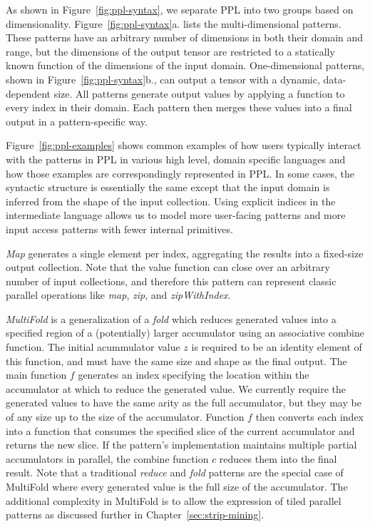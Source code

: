 As shown in Figure~\ref{fig:ppl-syntax}, we separate PPL into two groups based on dimensionality.
Figure~\ref{fig:ppl-syntax}a. lists the multi-dimensional patterns.
These patterns have an arbitrary number of dimensions in both their domain and range,
but the dimensions of the output tensor
are restricted to a statically known function of the dimensions of the input domain.
One-dimensional patterns, shown in Figure~\ref{fig:ppl-syntax}b., can output a tensor with a dynamic, data-dependent size.
All patterns generate output values by applying a function to
every index in their domain. Each pattern then merges these values into a final
output in a pattern-specific way.



Figure~\ref{fig:ppl-examples} shows common examples of how users typically interact with
the patterns in PPL in various high level, domain specific languages
and how those examples are correspondingly represented in PPL. In some cases, the syntactic structure is
essentially the same except that the input domain is inferred from the shape of
the input collection. Using explicit indices in the intermediate language allows
us to model more user-facing patterns and more input access patterns with fewer internal primitives.

\emph{Map} generates a single element per index, aggregating the results into a fixed-size output collection.
Note that the value function can close over an arbitrary number of input collections, and therefore this pattern can represent classic parallel operations like \emph{map}, \emph{zip},
and \emph{zipWithIndex}.

\emph{MultiFold} is a generalization of a \emph{fold} which reduces generated values into a specified region of a (potentially) larger accumulator using an associative combine function.
The initial acummulator value $z$ is required to be an identity element of this function, and must have the same size and shape as the final output.
The main function $f$ generates an index specifying the location within the accumulator at which to reduce the generated value. We currently require the generated values to have the same arity as the full accumulator, but they may be of any size up to the size of the accumulator.
Function $f$ then converts each index into a function that consumes the specified
slice of the current accumulator and returns the new slice. If the pattern's
implementation maintains multiple partial accumulators in parallel, the combine
function $c$ reduces them into the final result.
Note that a traditional \emph{reduce} and \emph{fold} patterns are the special
case of MultiFold where every generated value is the full size of the accumulator.
The additional complexity in MultiFold is to allow the expression of tiled
parallel patterns as discussed further in Chapter~\ref{sec:strip-mining}.

